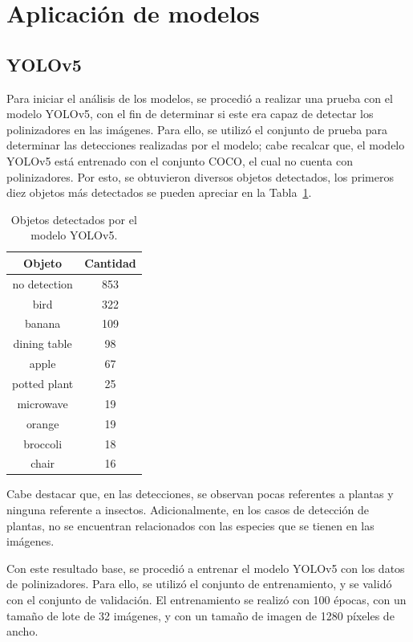 \section{Aplicación de modelos}

\subsection{YOLOv5}

Para iniciar el análisis de los modelos, se procedió a realizar una prueba con el modelo YOLOv5, con el fin de determinar si este era capaz de detectar los polinizadores en las imágenes. Para ello, se utilizó el conjunto de prueba para determinar las detecciones realizadas por el modelo; cabe recalcar que, el modelo YOLOv5 está entrenado con el conjunto COCO, el cual no cuenta con polinizadores. Por esto, se obtuvieron diversos objetos detectados, los primeros diez objetos más detectados se pueden apreciar en la Tabla~\ref{tab:objetos_detectados}.

\begin{table}[H]
    \centering\small
    \begin{tabular}{cc}
        \toprule
        \textbf{Objeto} & \textbf{Cantidad} \\
        \midrule
        no detection &  853 \\
        bird         &  322 \\
        banana       &  109 \\
        dining table &   98 \\
        apple        &   67 \\
        potted plant &   25 \\
        microwave    &   19 \\
        orange       &   19 \\
        broccoli     &   18 \\
        chair        &   16 \\
        \bottomrule
    \end{tabular}
    \caption{Objetos detectados por el modelo YOLOv5.}
    \label{tab:objetos_detectados}
\end{table}

Cabe destacar que, en las detecciones, se observan pocas referentes a plantas y ninguna referente a insectos. Adicionalmente, en los casos de detección de plantas, no se encuentran relacionados con las especies que se tienen en las imágenes.

Con este resultado base, se procedió a entrenar el modelo YOLOv5 con los datos de polinizadores. Para ello, se utilizó el conjunto de entrenamiento, y se validó con el conjunto de validación. El entrenamiento se realizó con 100 épocas, con un tamaño de lote de 32 imágenes, y con un tamaño de imagen de 1280 píxeles de ancho. 


